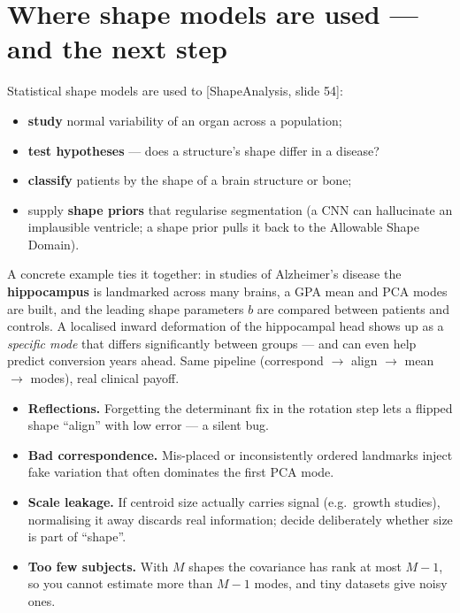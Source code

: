 \documentclass[11pt]{article}
\newcommand{\deck}[1]{\textsf{\small[#1]}}
\begin{document}
\section{Where shape models are used --- and the next step}

Statistical shape models are used to \deck{ShapeAnalysis, slide 54}:
\begin{itemize}[nosep,leftmargin=*]
  \item \textbf{study} normal variability of an organ across a population;
  \item \textbf{test hypotheses} --- does a structure's shape differ in a disease?
  \item \textbf{classify} patients by the shape of a brain structure or bone;
  \item supply \textbf{shape priors} that regularise segmentation (a CNN can
  hallucinate an implausible ventricle; a shape prior pulls it back to the
  Allowable Shape Domain).
\end{itemize}

A concrete example ties it together: in studies of Alzheimer's disease the
\textbf{hippocampus} is landmarked across many brains, a GPA mean and PCA modes
are built, and the leading shape parameters $b$ are compared between patients and
controls. A localised inward deformation of the hippocampal head shows up as a
\emph{specific mode} that differs significantly between groups --- and can even
help predict conversion years ahead. Same pipeline (correspond $\to$ align
$\to$ mean $\to$ modes), real clinical payoff.

\begin{notebox}
\begin{itemize}[nosep,leftmargin=*]
  \item \textbf{Reflections.} Forgetting the determinant fix in the rotation
  step lets a flipped shape ``align'' with low error --- a silent bug.
  \item \textbf{Bad correspondence.} Mis-placed or inconsistently ordered
  landmarks inject fake variation that often dominates the first PCA mode.
  \item \textbf{Scale leakage.} If centroid size actually carries signal
  (e.g.\ growth studies), normalising it away discards real information; decide
  deliberately whether size is part of ``shape''.
  \item \textbf{Too few subjects.} With $M$ shapes the covariance has rank at
  most $M-1$, so you cannot estimate more than $M-1$ modes, and tiny datasets
  give noisy ones.
\end{itemize}
\end{notebox}
\end{document}
